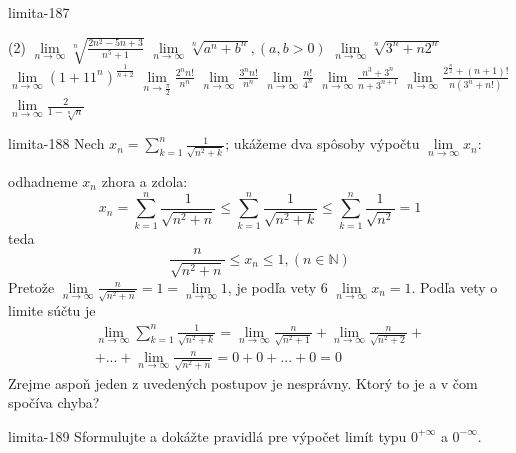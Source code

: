\begin{defproblem}{limita-187}
\begin{tasks}(2)
    \task $\lim\limits_{n \rightarrow \infty} \sqrt[n]{\frac{2n^2-5n+3}{n^5+1}}$
    \task $\lim\limits_{n \rightarrow \infty} \sqrt[n]{a^n+b^n},(a,b>0)$
    \task $\lim\limits_{n \rightarrow \infty} \sqrt[n]{3^n+n2^n}$
    \task $\lim\limits_{n \rightarrow \infty} (1+11^n)^{\frac{1}{n+2}}$
    \task $\lim\limits_{n \rightarrow \frac{\pi}{2}} \frac{2^nn!}{n^n}$
    \task $\lim\limits_{n \rightarrow \infty} \frac{3^nn!}{n^n}$
    \task $\lim\limits_{n \rightarrow \infty} \frac{n!}{4^n}$
    \task $\lim\limits_{n \rightarrow \infty} \frac{n^3+3^n}{n+3^{n+1}}$
    \task $\lim\limits_{n \rightarrow \infty} \frac{2^{\frac{n}{2}}+(n+1)!}{n(3^n+n!)}$
    \task $\lim\limits_{n \rightarrow \infty} \frac{2}{1-\sqrt[n]{n}}$
\end{tasks}
\end{defproblem}

\begin{defproblem}{limita-188}
Nech $x_n=\sum_{k=1}^n \frac{1}{\sqrt{n^2+k}}$; ukážeme dva spôsoby výpočtu $\lim\limits_{n \rightarrow \infty} x_n:$
\begin{tasks}
\task odhadneme $x_n$ zhora a zdola:
\[
    x_n=\sum_{k=1}^n \frac{1}{\sqrt{n^2+n}}
    \leq
    \sum_{k=1}^n \frac{1}{\sqrt{n^2+k}}
    \leq
    \sum_{k=1}^n \frac{1}{\sqrt{n^2}}=1
\]
teda
\[
    \frac{n}{\sqrt{n^2+n}}\leq x_n \leq 1, (n \in \mathbb{N})
\]
Pretože $\lim\limits_{n \rightarrow \infty}
\frac{n}{\sqrt{n^2+n}}=1=\lim\limits_{n \rightarrow \infty} 1$, je podľa vety
$6$ $\lim\limits_{n \rightarrow \infty} x_n=1$. \task Podľa vety o limite súčtu
je
\begin{multline*}
    \lim\limits_{n \rightarrow \infty} \sum_{k=1}^n
        \frac{1}{\sqrt{n^2+k}}
        =\lim\limits_{n \rightarrow \infty}
        \frac{n}{\sqrt{n^2+1}}+\lim\limits_{n \rightarrow \infty}
        \frac{n}{\sqrt{n^2+2}} + \\
        + ... + \lim\limits_{n \rightarrow \infty}
        \frac{n}{\sqrt{n^2+n}}
        = 0 + 0 + ... + 0 = 0
\end{multline*}
Zrejme aspoň jeden z uvedených postupov je nesprávny. Ktorý to je a v čom
spočíva chyba?
\end{tasks}
\end{defproblem}

\begin{defproblem}{limita-189}
Sformulujte a dokážte pravidlá pre výpočet limít typu $0^{+\infty}$ a
$0^{-\infty}$.
\end{defproblem}

